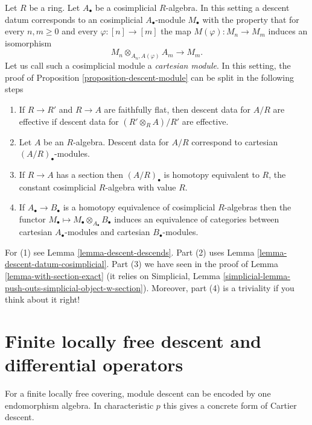 \begin{remark}
\label{remark-homotopy-equivalent-cosimplicial-algebras}
Let $R$ be a ring. Let $A_\bullet$ be a cosimplicial $R$-algebra.
In this setting a descent datum corresponds to an cosimplicial
$A_\bullet$-module $M_\bullet$ with the property that for
every $n, m \geq 0$ and every $\varphi : [n] \to [m]$ the
map $M(\varphi) : M_n \to M_m$ induces an isomorphism
$$
M_n \otimes_{A_n, A(\varphi)} A_m \longrightarrow M_m.
$$
Let us call such a cosimplicial module a {\it cartesian module}.
In this setting, the proof of Proposition \ref{proposition-descent-module}
can be split in the following steps
\begin{enumerate}
\item If $R \to R'$ and $R \to A$ are faithfully flat,
then descent data for $A/R$ are effective if
descent data for $(R' \otimes_R A)/R'$ are effective.
\item Let $A$ be an $R$-algebra. Descent data for $A/R$ correspond
to cartesian $(A/R)_\bullet$-modules.
\item If $R \to A$ has a section then $(A/R)_\bullet$ is homotopy
equivalent to $R$, the constant cosimplicial
$R$-algebra with value $R$.
\item If $A_\bullet \to B_\bullet$ is a homotopy equivalence of
cosimplicial $R$-algebras then the functor
$M_\bullet \mapsto M_\bullet \otimes_{A_\bullet} B_\bullet$
induces an equivalence of categories between cartesian
$A_\bullet$-modules and cartesian $B_\bullet$-modules.
\end{enumerate}
For (1) see Lemma \ref{lemma-descent-descends}.
Part (2) uses Lemma \ref{lemma-descent-datum-cosimplicial}.
Part (3) we have seen in the proof of Lemma \ref{lemma-with-section-exact}
(it relies on Simplicial,
Lemma \ref{simplicial-lemma-push-outs-simplicial-object-w-section}).
Moreover, part (4) is a triviality if you think about it right!
\end{remark}








\section{Finite locally free descent and differential operators}
\label{section-finite-locally-free-operator-descent}

\noindent
For a finite locally free covering, module descent can be encoded by one
endomorphism algebra. In characteristic $p$ this gives a concrete form of
Cartier descent.


